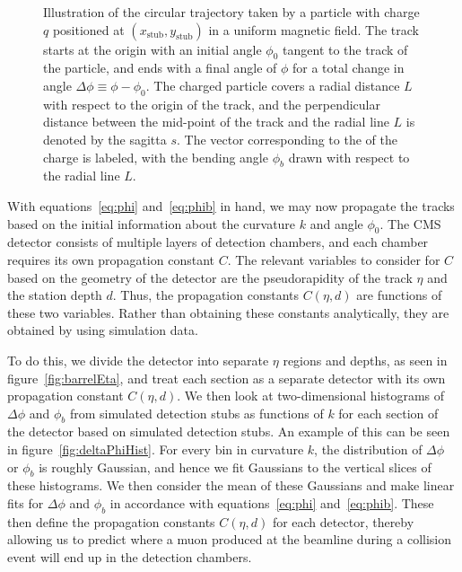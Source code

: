 \begin{figure}[htbp]
  \centering
  
  \caption{
    Illustration of the circular trajectory taken by a particle with charge $q$ positioned at $(x_\mathrm{stub},y_\mathrm{stub})$ in a uniform magnetic field.
    The track starts at the origin with an initial angle $\phi_0$ tangent to the track of the particle, and ends with a final angle of $\phi$ for a total change in angle $\Delta\phi\equiv\phi-\phi_0$.
    The charged particle covers a radial distance $L$ with respect to the origin of the track, and the perpendicular distance between the mid-point of the track and the radial line $L$ is denoted by the sagitta $s$.
    The vector corresponding to the \pt of the charge is labeled, with the bending angle $\phi_b$ drawn with respect to the radial line $L$.
  }
  \label{fig:arc}
\end{figure}

With equations~\ref{eq:phi} and~\ref{eq:phib} in hand, we may now propagate the tracks based on the initial information about the curvature $k$ and angle $\phi_0$.
The CMS detector consists of multiple layers of detection chambers, and each chamber requires its own propagation constant $C$.
The relevant variables to consider for $C$ based on the geometry of the detector are the pseudorapidity of the track $\eta$ and the station depth $d$.
Thus, the propagation constants $C(\eta,d)$ are functions of these two variables.
Rather than obtaining these constants analytically, they are obtained by using simulation data. %

To do this, we divide the detector into separate $\eta$ regions and depths, as seen in figure~\ref{fig:barrelEta}, and treat each section as a separate detector with its own propagation constant $C(\eta,d)$.
We then look at two-dimensional histograms of $\Delta\phi$ and $\phi_b$ from simulated detection stubs as functions of $k$ for each section of the detector based on simulated detection stubs.
An example of this can be seen in figure~\ref{fig:deltaPhiHist}.
For every bin in curvature $k$, the distribution of $\Delta\phi$ or $\phi_b$ is roughly Gaussian, and hence we fit Gaussians to the vertical slices of these histograms.
We then consider the mean of these Gaussians and make linear fits for $\Delta\phi$ and $\phi_b$ in accordance with equations~\ref{eq:phi} and~\ref{eq:phib}.
These then define the propagation constants $C(\eta,d)$ for each detector, thereby allowing us to predict where a muon produced at the beamline during a collision event will end up in the detection chambers.

